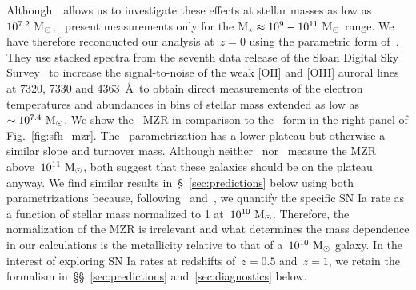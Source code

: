 \documentclass[ms.tex]{subfiles}
\begin{document}
Although~\um~allows us to investigate these effects at stellar masses as low as
$10^{7.2}~\text{M}_\odot$,~\citet{Zahid2014} present measurements only for the
$\text{M}_\star \approx 10^9 - 10^{11}~\text{M}_\odot$ range.
We have therefore reconducted our analysis at~$z = 0$ using the parametric form
of~\citet{Andrews2013}.
They use stacked spectra from the seventh data release of the Sloan Digital
Sky Survey~\citep[SDSS;][]{York2000, Abazajian2009, Abdorrouf2022} to increase
the signal-to-noise of the weak [OII] and [OIII] auroral lines at 7320, 7330
and 4363~\AA~to obtain direct measurements of the electron temperatures and
abundances in bins of stellar mass extended as low as~$\sim 10^{7.4}~\text{M}_\odot$.
We show the~\citet{Andrews2013} MZR in comparison to the~\citet{Zahid2014} form
in the right panel of Fig.~\ref{fig:sfh_mzr}.
The~\citet{Andrews2013} parametrization has a lower plateau but otherwise a
similar slope and turnover mass.
Although neither~\citet{Andrews2013} nor~\citet{Zahid2014} measure the MZR
above~$10^{11}~\text{M}_\odot$, both suggest that these galaxies should be on the
plateau anyway.
We find similar results in~\S~\ref{sec:predictions} below using both
parametrizations because, following~\citet{Brown2019} and~\citet{Gandhi2022},
we quantify the specific SN Ia rate as a function of stellar mass normalized to
1 at~$10^{10}~\text{M}_\odot$.
Therefore, the normalization of the MZR is irrelevant and what determines the
mass dependence in our calculations is the metallicity relative to that of
a~$10^{10}~\text{M}_\odot$ galaxy.
In the interest of exploring SN Ia rates at redshifts of~$z = 0.5$ and~$z = 1$,
we retain the~\citet{Zahid2014} formalism in~\S\S~\ref{sec:predictions}
and~\ref{sec:diagnostics} below.
\end{document}

